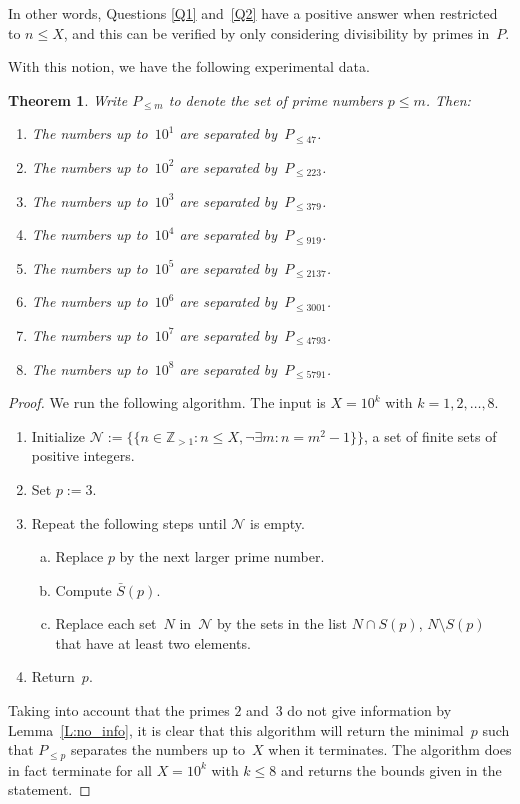 \documentclass[12pt,a4paper]{amsart}
\newcommand{\Z}{{\mathbb Z}}
\newcommand{\CN}{{\mathcal N}}
\newtheorem{Theorem}{Theorem}[section]
\theoremstyle{definition}
\numberwithin{equation}{section}
\begin{document}
In other words, Questions \ref{Q1} and~\ref{Q2} have a positive answer when restricted to $n \leqslant X$,
and this can be verified by only considering divisibility by primes in~$P$.

With this notion, we have the following experimental data.

\begin{Theorem} \label{T:sep}
  Write $P_{\leqslant m}$ to denote the set of prime numbers $p \leqslant m$. Then:
  \begin{enumerate}[\upshape(1)]
    \item The numbers up to~$10^1$ are separated by~$P_{\leqslant 47}$.
    \item The numbers up to~$10^2$ are separated by~$P_{\leqslant 223}$.
    \item The numbers up to~$10^3$ are separated by~$P_{\leqslant 379}$.
    \item The numbers up to~$10^4$ are separated by~$P_{\leqslant 919}$.
    \item The numbers up to~$10^5$ are separated by~$P_{\leqslant 2137}$.
    \item The numbers up to~$10^6$ are separated by~$P_{\leqslant 3001}$.
    \item The numbers up to~$10^7$ are separated by~$P_{\leqslant 4793}$.
    \item The numbers up to~$10^8$ are separated by~$P_{\leqslant 5791}$.
  \end{enumerate}
\end{Theorem}

\begin{proof}
  We run the following algorithm. The input is $X = 10^k$ with $k = 1, 2, \ldots, 8$.
  \begin{enumerate}[1.]
    \item Initialize $\CN := \{\{n \in \Z_{> 1} : n \leqslant X, \neg\exists m \colon n = m^2 - 1\}\}$,
          a set of finite sets of positive integers.
    \item Set $p := 3$.
    \item Repeat the following steps until $\CN$ is empty.
          \begin{enumerate}[a.]
            \item Replace $p$ by the next larger prime number.
            \item Compute $\bar{S}(p)$.
            \item Replace each set~$N$ in~$\CN$ by the sets
                  in the list $N \cap S(p)$, $N \setminus S(p)$ that have at least two elements.
          \end{enumerate}
    \item Return~$p$.
  \end{enumerate}
  Taking into account that the primes $2$ and~$3$ do not give information by Lemma~\ref{L:no_info},
  it is clear that this algorithm will return the minimal~$p$ such that $P_{\leqslant p}$ separates
  the numbers up to~$X$ when it terminates. The algorithm does in fact terminate
  for all $X = 10^k$ with $k \leqslant 8$ and returns the bounds given in the statement.
\end{proof}
\end{document}
